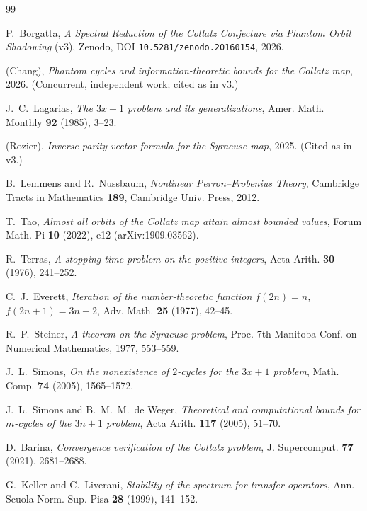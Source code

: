 \documentclass[11pt,a4paper]{article}
\theoremstyle{definition}
\begin{document}
\begin{thebibliography}{99}

P.~Borgatta,
\emph{A Spectral Reduction of the Collatz Conjecture via Phantom Orbit
Shadowing} (v3),
Zenodo, DOI \texttt{10.5281/zenodo.20160154}, 2026.

(Chang),
\emph{Phantom cycles and information-theoretic bounds for the Collatz
map}, 2026. (Concurrent, independent work; cited as in v3.)

J.~C.~Lagarias,
\emph{The $3x+1$ problem and its generalizations},
Amer. Math. Monthly \textbf{92} (1985), 3--23.

(Rozier),
\emph{Inverse parity-vector formula for the Syracuse map}, 2025.
(Cited as in v3.)

B.~Lemmens and R.~Nussbaum,
\emph{Nonlinear Perron--Frobenius Theory},
Cambridge Tracts in Mathematics \textbf{189}, Cambridge Univ. Press, 2012.

T.~Tao,
\emph{Almost all orbits of the Collatz map attain almost bounded values},
Forum Math. Pi \textbf{10} (2022), e12 (arXiv:1909.03562).

R.~Terras,
\emph{A stopping time problem on the positive integers},
Acta Arith. \textbf{30} (1976), 241--252.

C.~J.~Everett,
\emph{Iteration of the number-theoretic function $f(2n)=n$, $f(2n+1)=3n+2$},
Adv. Math. \textbf{25} (1977), 42--45.

R.~P.~Steiner,
\emph{A theorem on the Syracuse problem},
Proc. 7th Manitoba Conf. on Numerical Mathematics, 1977, 553--559.

J.~L.~Simons,
\emph{On the nonexistence of $2$-cycles for the $3x+1$ problem},
Math. Comp. \textbf{74} (2005), 1565--1572.

J.~L.~Simons and B.~M.~M.~de Weger,
\emph{Theoretical and computational bounds for $m$-cycles of the
$3n+1$ problem},
Acta Arith. \textbf{117} (2005), 51--70.

D.~Barina,
\emph{Convergence verification of the Collatz problem},
J. Supercomput. \textbf{77} (2021), 2681--2688.

G.~Keller and C.~Liverani,
\emph{Stability of the spectrum for transfer operators},
Ann. Scuola Norm. Sup. Pisa \textbf{28} (1999), 141--152.

\end{thebibliography}
\end{document}
